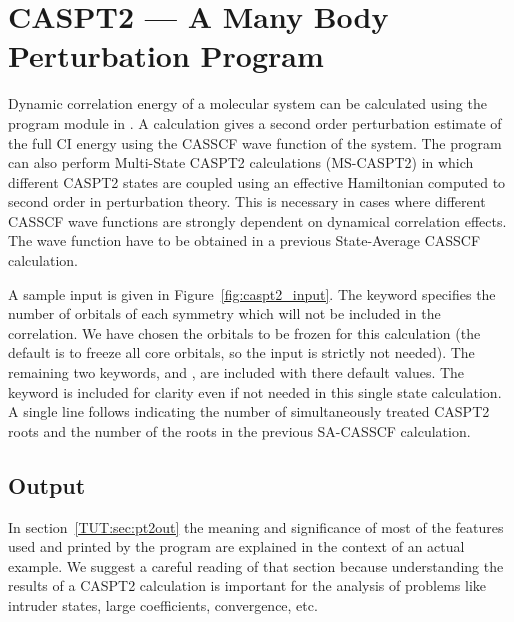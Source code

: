 \section{CASPT2 --- A Many Body Perturbation Program} 
\label{TUT:sec:caspt2}
Dynamic correlation energy of a molecular system can be calculated using
the  program module in \molcas.  A 
calculation gives a second order perturbation estimate of the full CI energy 
using the CASSCF wave function of the system. 
The program can also perform Multi-State CASPT2 calculations (MS-CASPT2) in 
which different CASPT2 states are coupled using an effective Hamiltonian
computed to second order in perturbation theory. This is necessary in cases
where different CASSCF wave functions are strongly dependent on dynamical
correlation effects. The wave function have to be obtained in a previous 
State-Average CASSCF calculation.


A sample input is given in Figure~\ref{fig:caspt2_input}. The
 keyword specifies the number of orbitals of each
symmetry which will not be included in the correlation.  We have
chosen the   orbitals to be frozen
for this calculation (the default is to freeze all core orbitals, so the input
is strictly not needed).  The remaining two keywords,  and 
, are included with there default values. The 
 keyword is included for clarity even if not needed in this single
state calculation. A single line follows indicating the number of 
simultaneously treated CASPT2 roots and the number of the roots in the previous 
SA-CASSCF calculation.

\subsection{ Output}


\ifmanual
In section~\ref{TUT:sec:pt2out} the meaning and significance of most of the
features used and printed by the  program are explained in the 
context of an actual example. We suggest a careful reading of that section
because understanding the results of a CASPT2 calculation is important for
the analysis of problems like intruder states, large coefficients, convergence,
etc.
\fi

